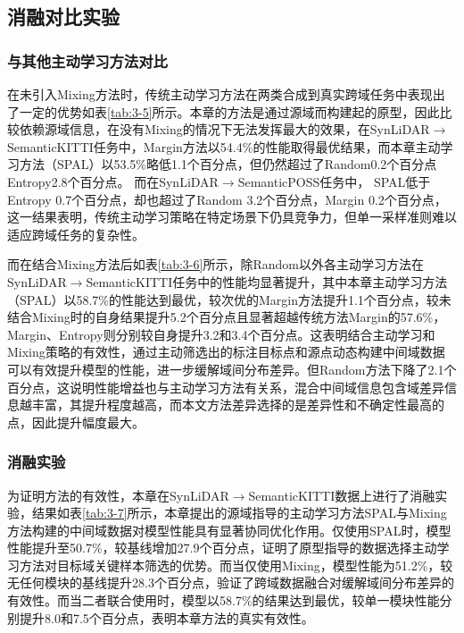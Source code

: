 \subsection{消融对比实验}
\subsubsection{与其他主动学习方法对比}
在未引入Mixing方法时，传统主动学习方法在两类合成到真实跨域任务中表现出了一定的优势如表\ref{tab:3-5}所示。本章的方法是通过源域而构建起的原型，因此比较依赖源域信息，在没有Mixing的情况下无法发挥最大的效果，在SynLiDAR$\to$SemanticKITTI任务中，Margin方法以54.4\%的性能取得最优结果，而本章主动学习方法（SPAL）以53.5\%略低1.1个百分点，但仍然超过了Random0.2个百分点Entropy2.8个百分点。
而在SynLiDAR$\to$SemanticPOSS任务中，
SPAL低于Entropy 0.7个百分点，却也超过了Random 3.2个百分点，Margin 0.2个百分点，这一结果表明，传统主动学习策略在特定场景下仍具竞争力，但单一采样准则难以适应跨域任务的复杂性。

\vspace{0.1cm}


而在结合Mixing方法后如表\ref{tab:3-6}所示，除Random以外各主动学习方法在SynLiDAR$\to$SemanticKITTI任务中的性能均显著提升，其中本章主动学习方法（SPAL）以58.7\%的性能达到最优，较次优的Margin方法提升1.1个百分点，较未结合Mixing时的自身结果提升5.2个百分点且显著超越传统方法Margin的57.6\%，Margin、Entropy则分别较自身提升3.2和3.4个百分点。这表明结合主动学习和Mixing策略的有效性，通过主动筛选出的标注目标点和源点动态构建中间域数据可以有效提升模型的性能，进一步缓解域间分布差异。但Random方法下降了2.1个百分点，这说明性能增益也与主动学习方法有关系，混合中间域信息包含域差异信息越丰富，其提升程度越高，而本文方法差异选择的是差异性和不确定性最高的点，因此提升幅度最大。
\vspace{0.1cm}


\subsubsection{消融实验}
为证明方法的有效性，本章在SynLiDAR$\to$SemanticKITTI数据上进行了消融实验，结果如表\ref{tab:3-7}所示，本章提出的源域指导的主动学习方法SPAL与Mixing方法构建的中间域数据对模型性能具有显著协同优化作用。仅使用SPAL时，模型性能提升至50.7\%，较基线增加27.9个百分点，证明了原型指导的数据选择主动学习方法对目标域关键样本筛选的优势。而当仅使用Mixing，模型性能为51.2\%，较无任何模块的基线提升28.3个百分点，验证了跨域数据融合对缓解域间分布差异的有效性。而当二者联合使用时，模型以58.7\%的结果达到最优，较单一模块性能分别提升8.0和7.5个百分点，表明本章方法的真实有效性。
\vspace{0.1cm}


